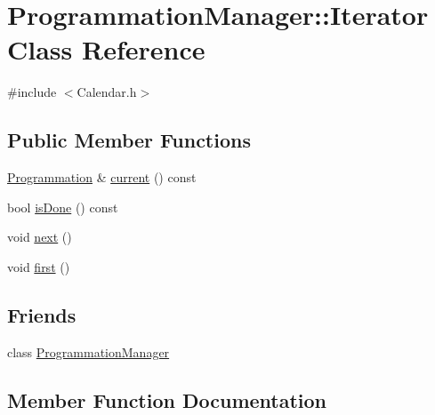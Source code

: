 \hypertarget{class_programmation_manager_1_1_iterator}{}\section{Programmation\+Manager\+:\+:Iterator Class Reference}
\label{class_programmation_manager_1_1_iterator}


{\ttfamily \#include $<$Calendar.\+h$>$}

\subsection*{Public Member Functions}
\begin{DoxyCompactItemize}
\item 
\hyperlink{class_programmation}{Programmation} \& \hyperlink{class_programmation_manager_1_1_iterator_adc8ca4082b0e46a6d6191e10515f5c48}{current} () const 
\item 
bool \hyperlink{class_programmation_manager_1_1_iterator_ad3b7e90822ee8fcbff8a2067c82ede18}{is\+Done} () const 
\item 
void \hyperlink{class_programmation_manager_1_1_iterator_a281cdb33c35f959bb3c85d920fcba8aa}{next} ()
\item 
void \hyperlink{class_programmation_manager_1_1_iterator_aa0d878e59fc1d28c8d781f088f65214b}{first} ()
\end{DoxyCompactItemize}
\subsection*{Friends}
\begin{DoxyCompactItemize}
\item 
class \hyperlink{class_programmation_manager_1_1_iterator_ade7bfcbf8cec66b12064c8ff25993d73}{Programmation\+Manager}
\end{DoxyCompactItemize}


\subsection{Member Function Documentation}
\hypertarget{class_programmation_manager_1_1_iterator_adc8ca4082b0e46a6d6191e10515f5c48}{}
